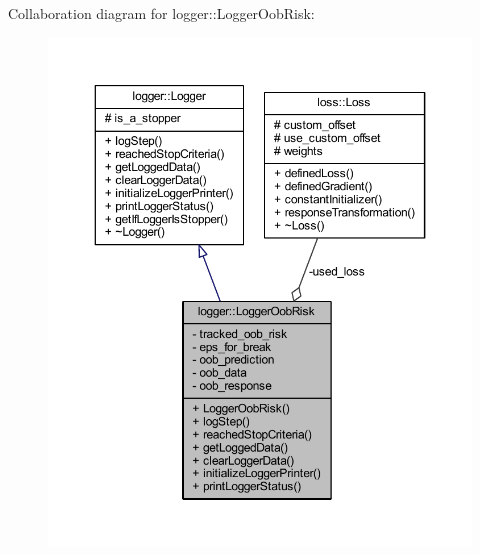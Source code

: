 Collaboration diagram for logger\+:\+:Logger\+Oob\+Risk\+:
\nopagebreak
\begin{figure}[H]
\begin{center}
\leavevmode
\includegraphics[width=350pt]{classlogger_1_1_logger_oob_risk__coll__graph}
\end{center}
\end{figure}
